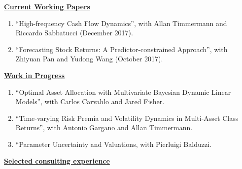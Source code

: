 \documentclass[12pt]{article}
\begin{document}
\underline{\textbf{Current Working Papers}}
\begin{enumerate}[resume]
	\item ``High-frequency Cash Flow Dynamics'', with Allan Timmermann and Riccardo Sabbatucci (December 2017).
	\item ``Forecasting Stock Returns: A Predictor-constrained Approach'', with Zhiyuan Pan and Yudong Wang (October 2017).
\end{enumerate}
\newpage 
\underline{\textbf{Work in Progress}}
\begin{enumerate}[resume]
	\item ``Optimal Asset Allocation with Multivariate Bayesian Dynamic Linear Models'', with Carlos Carvahlo and Jared Fisher.
	\item ``Time-varying Risk Premia and Volatility Dynamics in Multi-Asset Class Returns'', with Antonio Gargano and Allan Timmermann.
	\item ``Parameter Uncertainty and Valuations, with Pierluigi Balduzzi.
	
\end{enumerate}

\underline{\textbf{Selected consulting experience}}
\end{document}
